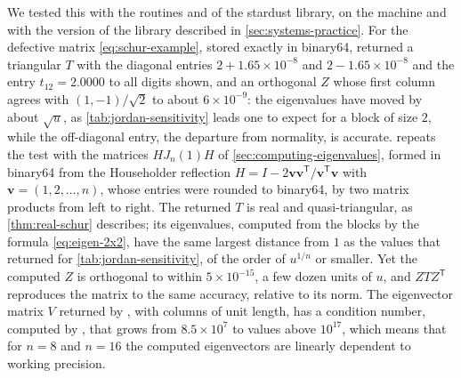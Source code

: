 We tested this with the routines  and  of the stardust library, on the machine and with the version of the library described in \cref{sec:systems-practice}. For the defective matrix \eqref{eq:schur-example}, stored exactly in binary64,  returned a triangular $T$ with the diagonal entries $2+1.65\times10^{-8}$ and $2-1.65\times10^{-8}$ and the entry $t_{12}=2.0000$ to all digits shown, and an orthogonal $Z$ whose first column agrees with $(1,-1)/\sqrt2$ to about $6\times10^{-9}$: the eigenvalues have moved by about $\sqrt u$, as \cref{tab:jordan-sensitivity} leads one to expect for a block of size $2$, while the off-diagonal entry, the departure from normality, is accurate.  repeats the test with the matrices $HJ_n(1)H$ of \cref{sec:computing-eigenvalues}, formed in binary64 from the Householder reflection $H=I-2\mathbf v\mathbf v^{\mathsf T}/\mathbf v^{\mathsf T}\mathbf v$ with $\mathbf v=(1,2,\ldots,n)$, whose entries were rounded to binary64, by two matrix products from left to right. The returned $T$ is real and quasi-triangular, as \cref{thm:real-schur} describes; its eigenvalues, computed from the blocks by the formula \eqref{eq:eigen-2x2}, have the same largest distance from $1$ as the values that  returned for \cref{tab:jordan-sensitivity}, of the order of $u^{1/n}$ or smaller. Yet the computed $Z$ is orthogonal to within $5\times10^{-15}$, a few dozen units of $u$, and $ZTZ^{\mathsf T}$ reproduces the matrix to the same accuracy, relative to its norm. The eigenvector matrix $V$ returned by , with columns of unit length, has a condition number, computed by , that grows from $8.5\times10^7$ to values above $10^{17}$, which means that for $n=8$ and $n=16$ the computed eigenvectors are linearly dependent to working precision.

